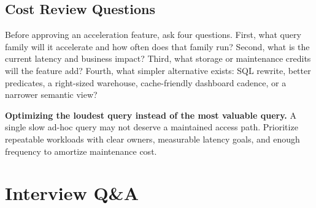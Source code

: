 \subsection{Cost Review Questions}
Before approving an acceleration feature, ask four questions. First, what query family will it accelerate and how often does that family run? Second, what is the current latency and business impact? Third, what storage or maintenance credits will the feature add? Fourth, what simpler alternative exists: SQL rewrite, better predicates, a right-sized warehouse, cache-friendly dashboard cadence, or a narrower semantic view?
\begin{pitfall}
\textbf{Optimizing the loudest query instead of the most valuable query.} A single slow ad-hoc query may not deserve a maintained access path. Prioritize repeatable workloads with clear owners, measurable latency goals, and enough frequency to amortize maintenance cost.
\end{pitfall}
\section{Interview Q\&A}
